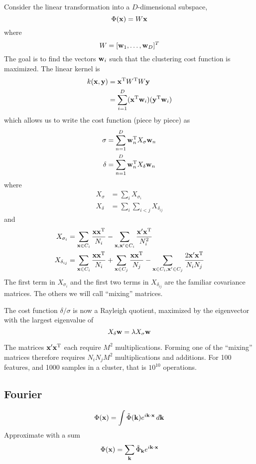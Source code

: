 \documentclass{article}
\newcommand{\bx}{{\bf x}}
\newcommand{\by}{{\bf y}}
\newcommand{\bw}{{\bf w}}
\newcommand{\bk}{{\bf k}}
\newcommand{\bxp}{\bx^{\prime}}
\begin{document}
Consider the linear transformation into a
$D$-dimensional subspace,
\[
\Phi(\bx) = W \bx
\]
where
\[
W = [\bw_1, \ldots, \bw_D]^T
\]
The goal is to find the vectors $\bw_i$ such that the clustering
cost function is maximized. The linear kernel is
\begin{align*}
k(\bx, \by)
  &= \bx^{\rm T} W^{\rm T} W \by \\
  &= \sum_{i=1}^D (\bx^{\rm T} \bw_i) (\by^{\rm T} \bw_i)
\end{align*}
which allows us to write the cost function (piece by piece) as
\begin{align*}
\sigma &= \sum_{n=1}^D \bw_n^{\rm T} X_{\sigma} \bw_n \\
\delta &= \sum_{n=1}^D \bw_n^{\rm T} X_{\delta} \bw_n
\end{align*}
where
\begin{align*}
X_{\sigma} &= \sum_i X_{\sigma_i} \\
X_{\delta} &= \sum_i \sum_{i<j} X_{\delta_{ij}}
\end{align*}
and
\begin{align*}
X_{\sigma_i} &=
  \sum_{\bx \in C_i} \frac{\bx \bx^{\rm T}}{N_i} -
  \sum_{\bx, \bxp \in C_i} \frac{\bxp \bx^{\rm T}}{N_i^2} \\
X_{\delta_{ij}} &=
  \sum_{\bx \in C_i} \frac{\bx \bx^{\rm T}}{N_i} +
  \sum_{\bx \in C_j} \frac{\bx \bx^{\rm T}}{N_j} -
  \sum_{\bx \in C_i, \bxp \in C_j} \frac{2 \bxp \bx^{\rm T}}{N_i N_j}
\end{align*}
The first term in $X_{\sigma_i}$ and the first two terms in
$X_{\delta_{ij}}$ are the familiar covariance matrices. The
others we will call ``mixing'' matrices.

The cost function $\delta / \sigma$ is now a Rayleigh quotient,
maximized by the eigenvector with the largest eigenvalue of
\[
X_{\delta} \bw = \lambda X_{\sigma} \bw
\]

The matrices $\bxp \bx^{\rm T}$ each require $M^2$ multiplications.
Forming one of the ``mixing'' matrices therefore requires $N_i N_j
M^2$ multiplications and additions. For 100 features, and 1000 samples
in a cluster, that is $10^{10}$ operations.


\subsection*{Fourier}

\[
\Phi(\bx) = \int \tilde{\Phi}(\bk) e^{i \bk \cdot \bx} \, d \bk
\]
Approximate with a sum
\[
\Phi(\bx) = \sum_{\bk} \tilde{\Phi}_{\bk} e^{i \bk \cdot \bx}
\]
\end{document}
